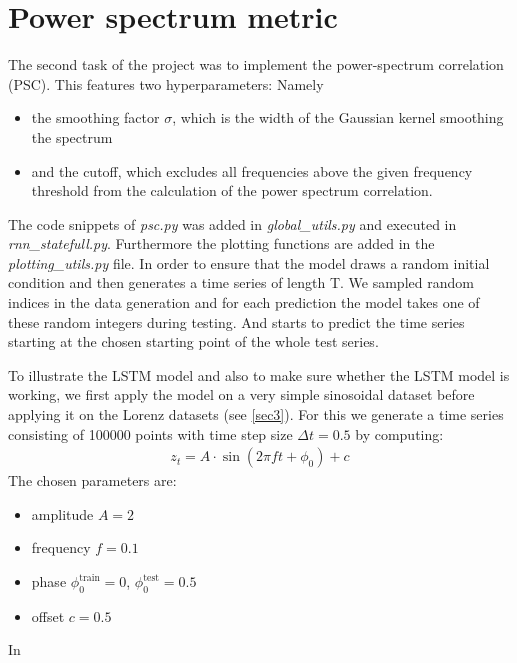 \section{Power spectrum metric}

The second task of the project was to implement the power-spectrum correlation (PSC). This features two hyperparameters: Namely
\begin{itemize}
	\item the smoothing factor $\sigma$, which is the width of the Gaussian kernel smoothing the spectrum
	\item and the cutoff, which excludes all frequencies above the given frequency threshold from the calculation of the power spectrum correlation.
\end{itemize}
The code snippets of \textit{psc.py} was added in \textit{global\_utils.py} and executed in \textit{rnn\_statefull.py}. Furthermore the plotting functions are added in the \textit{plotting\_utils.py} file.
In order to ensure that the model draws a random initial condition and then generates a time series of length T. We sampled random indices in the data generation and for each prediction the model takes one of these random integers during testing. And starts to predict the time series starting at the chosen starting point of the whole test series.

To illustrate the LSTM model and also to make sure whether the LSTM model is working, we first apply the model on a very simple sinosoidal dataset before applying it on the Lorenz datasets (see \cref{sec3}). For this we generate a time series consisting of 100000 points with time step size $\Delta t=0.5$ by computing:
\begin{align}
	z_t = A\cdot\sin(2\pi ft+\phi_0)+c
\end{align}
The chosen parameters are:
\begin{itemize}
	\setlength\itemsep{1em}
	\item amplitude $A = 2$
	\item frequency $f = 0.1$
	\item phase $\phi_0^{\text{train}}=0$, $\phi_0^{\text{test}}=0.5$
	\item offset $c=0.5$
\end{itemize}

In 